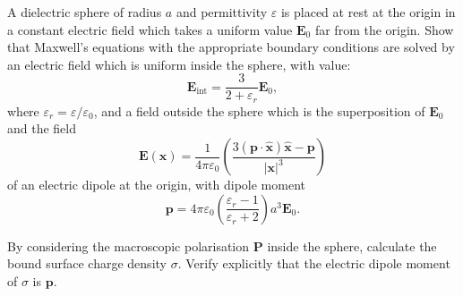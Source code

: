 A dielectric sphere of radius $a$ and permittivity $\varepsilon$ is
placed at rest at the origin in a constant electric field which takes a uniform
value $\mathbf{E}_0$ far from the origin. Show that Maxwell's equations with
the appropriate boundary conditions are solved by an electric field which is
uniform inside the sphere, with value:
\begin{equation}
  \mathbf{E}_{\mathrm{int}} = \frac{3}{2+\varepsilon_r}\mathbf{E}_0,
\end{equation}
where $\varepsilon_r = \varepsilon/\varepsilon_0$, and a field outside the
sphere which is the superposition of $\mathbf{E}_0$ and the field
\begin{equation}
  \mathbf{E}(\mathbf{x}) = \frac{1}{4\pi\varepsilon_0}
  \left(\frac{3(\mathbf{p}\cdot\hat{\mathbf{x}})\hat{\mathbf{x}}-\mathbf{p}}{|\mathbf{x}|^3}\right)
\end{equation}
of an electric dipole at the origin, with dipole moment
\begin{equation}
  \mathbf{p} = 4\pi\varepsilon_0\!\left(\frac{\varepsilon_r-1}{\varepsilon_r+2}\right)a^3\mathbf{E}_0.
\end{equation}

By considering the macroscopic polarisation $\mathbf{P}$ inside the sphere,
calculate the bound surface charge density $\sigma$. Verify explicitly that
the electric dipole moment of $\sigma$ is $\mathbf{p}$.

